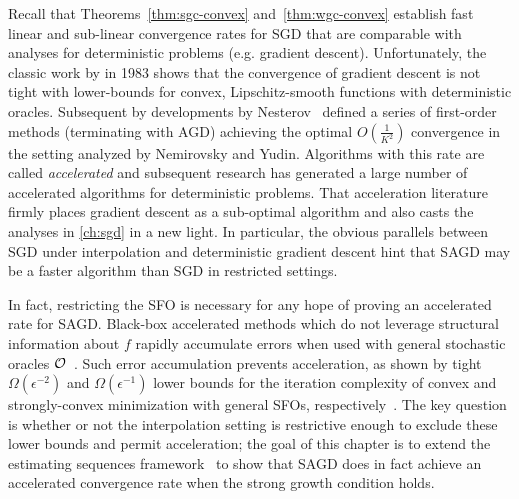 Recall that Theorems~\ref{thm:sgc-convex} and~\ref{thm:wgc-convex} establish fast linear and sub-linear convergence rates for \ac{SGD} that are comparable with analyses for deterministic problems (e.g. gradient descent).
Unfortunately, the classic work by \citet{nemirovsky1983problem} in 1983 shows that the convergence of gradient descent is not tight with lower-bounds for convex, Lipschitz-smooth functions with deterministic oracles. 
Subsequent by developments by Nesterov~\citep{nesterov1983method, nemirovsky1985optimal, nesterov1988approach} defined a series of first-order methods (terminating with \ac{AGD}) achieving the optimal \( O(\frac{1}{K^2}) \) convergence in the setting analyzed by Nemirovsky and Yudin. 
Algorithms with this rate are called \emph{accelerated} and subsequent research has generated a large number of accelerated algorithms for deterministic problems.
That acceleration literature firmly places gradient descent as a sub-optimal algorithm and also casts the analyses in \autoref{ch:sgd} in a new light.
In particular, the obvious parallels between \ac{SGD} under interpolation and deterministic gradient descent hint that \ac{SAGD} may be a faster algorithm than \ac{SGD} in restricted settings. 

In fact, restricting the \ac{SFO} is necessary for any hope of proving an accelerated rate for \ac{SAGD}.
Black-box accelerated methods which do not leverage structural information about \( f \) rapidly accumulate errors when used with general stochastic oracles \( \oracle{} \)~\citep{devolder2014first, schmidt2011convergence}. 
Such error accumulation prevents acceleration, as shown by tight \( \Omega(\epsilon^{-2}) \) and \( \Omega(\epsilon^{-1}) \) lower bounds for the iteration complexity of convex and strongly-convex minimization with general \acp{SFO}, respectively~\citep{nemirovsky1983problem, agarwal2012information, raginsky2011information}.
The key question is whether or not the interpolation setting is restrictive enough to exclude these lower bounds and permit acceleration;
the goal of this chapter is to extend the estimating sequences framework~\citep{nesterov2004lectures} to show that \ac{SAGD} does in fact achieve an accelerated convergence rate when the strong growth condition holds.

